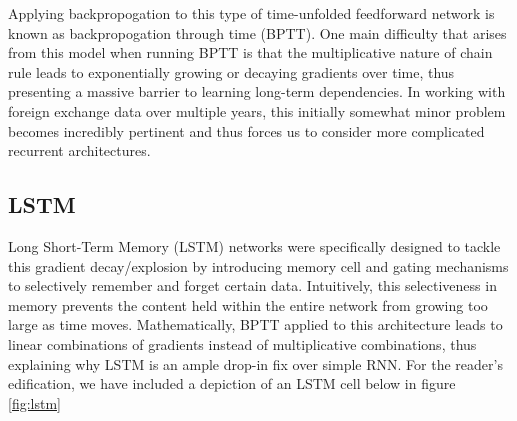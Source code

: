 \documentclass{article}
\begin{document}
Applying backpropogation to this type of time-unfolded feedforward network is known as backpropogation through time (BPTT). One main difficulty that arises from this model when running BPTT is that the multiplicative nature of chain rule leads to exponentially growing or decaying gradients over time, thus presenting a massive barrier to learning long-term dependencies. In working with foreign exchange data over multiple years, this initially somewhat minor problem becomes incredibly pertinent and thus forces us to consider more complicated recurrent architectures.

\subsection{LSTM}
Long Short-Term Memory (LSTM) networks were specifically designed to tackle this gradient decay/explosion by introducing memory cell and gating mechanisms to selectively remember and forget certain data. Intuitively, this selectiveness in memory prevents the content held within the entire network from growing too large as time moves. Mathematically, BPTT applied to this architecture leads to linear combinations of gradients instead of multiplicative combinations, thus explaining why LSTM is an ample drop-in fix over simple RNN. For the reader's edification, we have included a depiction of an LSTM cell below in figure \ref{fig:lstm}     
\end{document}
